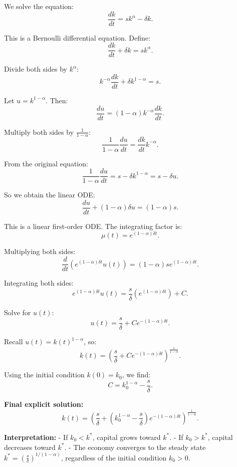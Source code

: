 We solve the equation:
\[
\frac{dk}{dt} = s k^\alpha - \delta k.
\]

This is a Bernoulli differential equation. Define:
\[
\frac{dk}{dt} + \delta k = s k^\alpha.
\]

Divide both sides by \( k^\alpha \):
\[
k^{-\alpha} \frac{dk}{dt} + \delta k^{1 - \alpha} = s.
\]

Let \( u = k^{1 - \alpha} \). Then:
\[
\frac{du}{dt} = (1 - \alpha) k^{-\alpha} \frac{dk}{dt}.
\]

Multiply both sides by \( \frac{1}{1 - \alpha} \):
\[
\frac{1}{1 - \alpha} \frac{du}{dt} = \frac{dk}{dt} k^{-\alpha}.
\]

From the original equation:
\[
\frac{1}{1 - \alpha} \frac{du}{dt} = s - \delta k^{1 - \alpha} = s - \delta u.
\]

So we obtain the linear ODE:
\[
\frac{du}{dt} + (1 - \alpha)\delta u = (1 - \alpha)s.
\]

This is a linear first-order ODE. The integrating factor is:
\[
\mu(t) = e^{(1 - \alpha)\delta t}.
\]

Multiplying both sides:
\[
\frac{d}{dt} \left( e^{(1 - \alpha)\delta t} u(t) \right) = (1 - \alpha)s e^{(1 - \alpha)\delta t}.
\]

Integrating both sides:
\[
e^{(1 - \alpha)\delta t} u(t) = \frac{s}{\delta} \left( e^{(1 - \alpha)\delta t} \right) + C.
\]

Solve for \( u(t) \):
\[
u(t) = \frac{s}{\delta} + C e^{-(1 - \alpha)\delta t}.
\]

Recall \( u(t) = k(t)^{1 - \alpha} \), so:
\[
k(t) = \left( \frac{s}{\delta} + C e^{-(1 - \alpha)\delta t} \right)^{\frac{1}{1 - \alpha}}.
\]

Using the initial condition \( k(0) = k_0 \), we find:
\[
C = k_0^{1 - \alpha} - \frac{s}{\delta}.
\]

\textbf{Final explicit solution:}
\[
k(t) = \left( \frac{s}{\delta} + \left( k_0^{1 - \alpha} - \frac{s}{\delta} \right) e^{-(1 - \alpha)\delta t} \right)^{\frac{1}{1 - \alpha}}.
\]

\vspace{1em}
\noindent
\textbf{Interpretation:}
- If \( k_0 < k^* \), capital grows toward \( k^* \).
- If \( k_0 > k^* \), capital decreases toward \( k^* \).
- The economy converges to the steady state \( k^* = \left( \frac{s}{\delta} \right)^{1/(1 - \alpha)} \), regardless of the initial condition \( k_0 > 0 \).